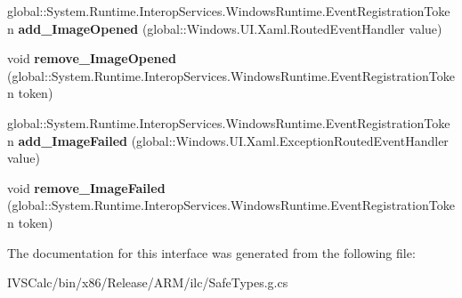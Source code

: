 \begin{DoxyCompactItemize}
\mbox{\label{interface_windows_1_1_u_i_1_1_xaml_1_1_media_1_1_imaging_1_1_i_bitmap_image_a0a0af7713d2dfccf2cd37b15f1f121ea}} 
global\+::\+System.\+Runtime.\+Interop\+Services.\+Windows\+Runtime.\+Event\+Registration\+Token {\bfseries add\+\_\+\+Image\+Opened} (global\+::\+Windows.\+U\+I.\+Xaml.\+Routed\+Event\+Handler value)
\item 
\mbox{\label{interface_windows_1_1_u_i_1_1_xaml_1_1_media_1_1_imaging_1_1_i_bitmap_image_ac903f9457bc42510bd952dcb07c5c1d1}} 
void {\bfseries remove\+\_\+\+Image\+Opened} (global\+::\+System.\+Runtime.\+Interop\+Services.\+Windows\+Runtime.\+Event\+Registration\+Token token)
\item 
\mbox{\label{interface_windows_1_1_u_i_1_1_xaml_1_1_media_1_1_imaging_1_1_i_bitmap_image_a6aa4435d5ae45040075c92c78e19dabb}} 
global\+::\+System.\+Runtime.\+Interop\+Services.\+Windows\+Runtime.\+Event\+Registration\+Token {\bfseries add\+\_\+\+Image\+Failed} (global\+::\+Windows.\+U\+I.\+Xaml.\+Exception\+Routed\+Event\+Handler value)
\item 
\mbox{\label{interface_windows_1_1_u_i_1_1_xaml_1_1_media_1_1_imaging_1_1_i_bitmap_image_ab77fcc8961126a071f77bee1dc55bcc6}} 
void {\bfseries remove\+\_\+\+Image\+Failed} (global\+::\+System.\+Runtime.\+Interop\+Services.\+Windows\+Runtime.\+Event\+Registration\+Token token)
\end{DoxyCompactItemize}


The documentation for this interface was generated from the following file\+:\begin{DoxyCompactItemize}
\item 
I\+V\+S\+Calc/bin/x86/\+Release/\+A\+R\+M/ilc/Safe\+Types.\+g.\+cs\end{DoxyCompactItemize}
